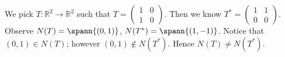 \begin{Exercise}
	\begin{solution}
		We pick $T:\mathbb{R}^2\to\mathbb{R}^2$ such that $T = \begin{pmatrix}
		1 & 0 \\
		1 & 0
		\end{pmatrix}$. Then we know $T^* = \begin{pmatrix}
		1 & 1 \\
		0 & 0
		\end{pmatrix}$. Observe $N(T) = \spann\{(0,1)\}$, $N(T^*) = \spann\{(1,-1)\}$. Notice that $(0,1) \in N(T)$; however $(0,1)\notin N(T^*)$. Hence $N(T)\neq N(T^*)$.
	\end{solution}
\end{Exercise}